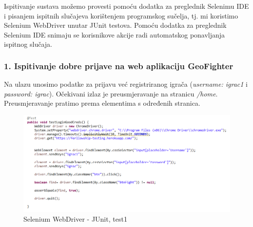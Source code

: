 			 
			
			{Ispitivanje sustava možemo provesti pomoću dodatka za preglednik Selenimu IDE i pisanjem ispitnih slučajeva korištenjem programskog sučelja, tj. mi koristimo Selenium WebDriver unutar JUnit testova. Pomoću dodatka za preglednik Selenium IDE snimaju se korisnikove akcije radi automatskog ponavljanja ispitnog slučaja.} 
			
			\subsubsection	{1. Ispitivanje dobre prijave na web aplikaciju GeoFighter }
			
				{Na ulazu unosimo podatke za prijavu već registriranog igrača (\emph{username: igrac1} i \emph{password: igrac}). Očekivani izlaz je preusmjeravanje na stranicu \emph{/home}. Preusmjeravanje pratimo prema elementima s određenih stranica. }
				
					\begin{figure}[H]
					\includegraphics[width=\textwidth]{slike/JUSeTest1} 
					\centering
					\caption{Selenium WebDriver - JUnit, test1}
					\label{}
					\end{figure}
				
